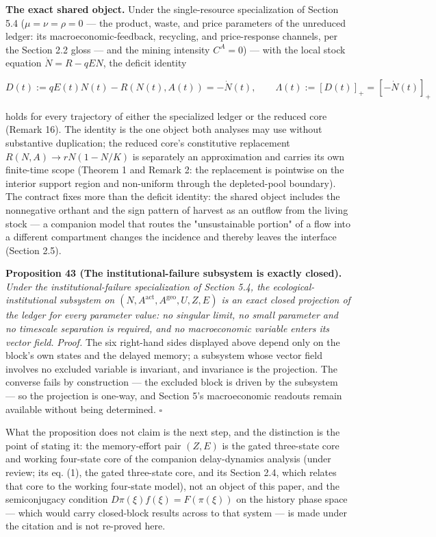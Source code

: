 \documentclass[11pt]{article}
\begin{document}
\textbf{The exact shared object.} Under the single-resource specialization of Section 5.4 (\(\mu = \nu = \rho = 0\) --- the product, waste, and price parameters of the unreduced ledger: its macroeconomic-feedback, recycling, and price-response channels, per the Section 2.2 gloss --- and the mining intensity \(C^A = 0\)) --- with the local stock equation \(\dot N = R - qEN\), the deficit identity 

$$D(t) := qE(t)N(t) - R(N(t), A(t)) = -\dot N(t), \qquad \Lambda(t) := [D(t)]_+ = [-\dot N(t)]_+$$

 holds for every trajectory of either the specialized ledger or the reduced core (Remark 16). The identity is the one object both analyses may use without substantive duplication; the reduced core's constitutive replacement \(R(N,\allowbreak{}A) \to rN(1 - N/\allowbreak{}K)\) is separately an approximation and carries its own finite-time scope (Theorem 1 and Remark 2: the replacement is pointwise on the interior support region and non-uniform through the depleted-pool boundary). The contract fixes more than the deficit identity: the shared object includes the nonnegative orthant and the sign pattern of harvest as an outflow from the living stock --- a companion model that routes the "unsustainable portion" of a flow into a different compartment changes the incidence and thereby leaves the interface (Section 2.5).

\textbf{Proposition 43 (The institutional-failure subsystem is exactly closed).} \emph{Under the institutional-failure specialization of Section 5.4, the ecological-institutional subsystem on \((N,\allowbreak{} A^{\mathrm{act}},\allowbreak{} A^{\mathrm{geo}},\allowbreak{} U,\allowbreak{} Z,\allowbreak{} E)\) is an exact closed projection of the ledger for every parameter value: no singular limit, no small parameter and no timescale separation is required, and no macroeconomic variable enters its vector field.} \emph{Proof.} The six right-hand sides displayed above depend only on the block's own states and the delayed memory; a subsystem whose vector field involves no excluded variable is invariant, and invariance is the projection. The converse fails by construction --- the excluded block is driven by the subsystem --- so the projection is one-way, and Section 5's macroeconomic readouts remain available without being determined. \(\square\)

What the proposition does not claim is the next step, and the distinction is the point of stating it: the memory-effort pair \((Z, E)\) is the gated three-state core and working four-state core of the companion delay-dynamics analysis (under review; its eq. (1), the gated three-state core, and its Section 2.4, which relates that core to the working four-state model), not an object of this paper, and the semiconjugacy condition \(D\pi(\xi) f(\xi) =\allowbreak{} F(\pi(\xi))\) on the history phase space --- which would carry closed-block results across to that system --- is made under the citation and is not re-proved here.
\end{document}
